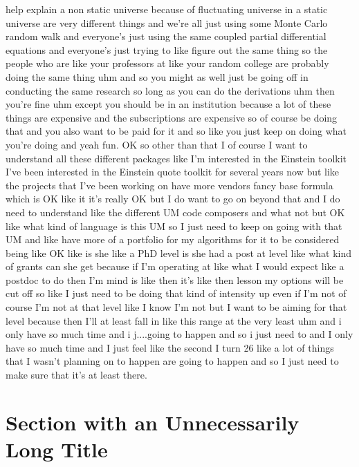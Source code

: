 help explain a non static universe because of fluctuating universe in a static universe are very different things and we're all just using some Monte Carlo random walk and everyone's just using the same coupled partial differential equations and everyone's just trying to like figure out the same thing so the people who are like your professors at like your random college are probably doing the same thing uhm and so you might as well just be going off in conducting the same research so long as you can do the derivations uhm then you're fine uhm except you should be in an institution because a lot of these things are expensive and the subscriptions are expensive so of course be doing that and you also want to be paid for it and so like you just keep on doing what you're doing and yeah fun. OK so other than that I of course I want to understand all these different packages like I'm interested in the Einstein toolkit I've been interested in the Einstein quote toolkit for several years now but like the projects that I've been working on have more vendors fancy base formula which is OK like it it's really OK but I do want to go on beyond that and I do need to understand like the different UM code composers and what not but OK like what kind of language is this UM so I just need to keep on going with that UM and like have more of a portfolio for my algorithms for it to be considered being like OK like is she like a PhD level is she had a post at level like what kind of grants can she get because if I'm operating at like what I would expect like a postdoc to do then I'm mind is like then it's like then lesson my options will be cut off so like I just need to be doing that kind of intensity up even if I'm not of course I'm not at that level like I know I'm not but I want to be aiming for that level because then I'll at least fall in like this range at the very least uhm and i only have so much time and i j....going to happen and so i just need to and I only have so much time and I just feel like the second I turn 26 like a lot of things that I wasn't planning on to happen are going to happen and so I just need to make sure that it's at least there.

\section[]{Section with an Unnecessarily Long Title}

